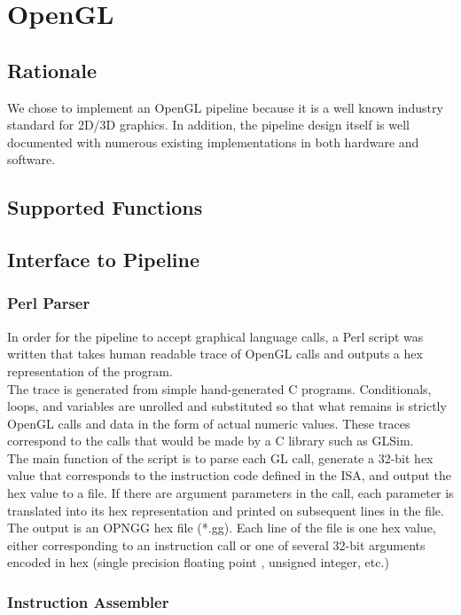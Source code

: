 \documentclass[letterpaper,10pt]{article}
\begin{document}
\section{OpenGL}
\subsection{Rationale}
We chose to implement an OpenGL pipeline because it is a well known industry standard for 2D/3D graphics. In addition, the pipeline design itself is well documented with numerous existing implementations in both hardware and software.

\subsection{Supported Functions}

\subsection{Interface to Pipeline}

\subsubsection{Perl Parser}
In order for the pipeline to accept graphical language calls, a Perl script was written that takes human readable trace of OpenGL calls and outputs a hex representation of the program. \\

The trace is generated from simple hand-generated C programs. Conditionals, loops, and variables are unrolled and substituted so that what remains is strictly OpenGL calls and data in the form of actual numeric values. These traces correspond to the calls that would be made by a C library such as GLSim.\\

The main function of the script is to parse each GL call, generate a 32-bit hex value that corresponds to the instruction code defined in the ISA, and output the hex value to a file. If there are argument parameters in the call, each parameter is translated into its hex representation and printed on subsequent lines in the file. The output is an OPNGG hex file (*.gg). Each line of the file is one hex value, either corresponding to an instruction call or one of several 32-bit arguments encoded in hex (single precision floating point , unsigned integer, etc.)

\subsubsection{Instruction Assembler}
\end{document}
